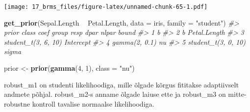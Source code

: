 \documentclass[]{book}
\newenvironment{Shaded}{\begin{snugshade}}{\end{snugshade}}
\newcommand{\CommentTok}[1]{\textcolor[rgb]{0.56,0.35,0.01}{\textit{#1}}}
\newcommand{\DataTypeTok}[1]{\textcolor[rgb]{0.13,0.29,0.53}{#1}}
\newcommand{\DecValTok}[1]{\textcolor[rgb]{0.00,0.00,0.81}{#1}}
\newcommand{\KeywordTok}[1]{\textcolor[rgb]{0.13,0.29,0.53}{\textbf{#1}}}
\newcommand{\NormalTok}[1]{#1}
\newcommand{\OperatorTok}[1]{\textcolor[rgb]{0.81,0.36,0.00}{\textbf{#1}}}
\newcommand{\StringTok}[1]{\textcolor[rgb]{0.31,0.60,0.02}{#1}}
\begin{document}
\texttt{[image: 17\_brms\_files/figure-latex/unnamed-chunk-65-1.pdf]}

\begin{Shaded}
\begin{Highlighting}[]
\KeywordTok{get_prior}\NormalTok{(Sepal.Length }\OperatorTok{~}\StringTok{ }\NormalTok{Petal.Length, }\DataTypeTok{data =}\NormalTok{ iris, }\DataTypeTok{family =} \StringTok{"student"}\NormalTok{)}
\CommentTok{#>                 prior     class         coef group resp dpar nlpar bound}
\CommentTok{#> 1                             b                                         }
\CommentTok{#> 2                             b Petal.Length                            }
\CommentTok{#> 3 student_t(3, 6, 10) Intercept                                         }
\CommentTok{#> 4       gamma(2, 0.1)        nu                                         }
\CommentTok{#> 5 student_t(3, 0, 10)     sigma}
\end{Highlighting}
\end{Shaded}

\begin{Shaded}
\begin{Highlighting}[]
\NormalTok{prior <-}\StringTok{ }\KeywordTok{prior}\NormalTok{(}\KeywordTok{gamma}\NormalTok{(}\DecValTok{4}\NormalTok{, }\DecValTok{1}\NormalTok{), }\DataTypeTok{class =} \StringTok{"nu"}\NormalTok{)}
\end{Highlighting}
\end{Shaded}

robust\_m1 on studenti likelihoodiga, mille õlgade kõrgus fititakse adaptiivselt andmete põhjal.
robust\_m2-s anname õlgade laiuse ette ja robust\_m3 on mitte-robustne kontroll tavalise normaalse likelihoodiga.
\end{document}

